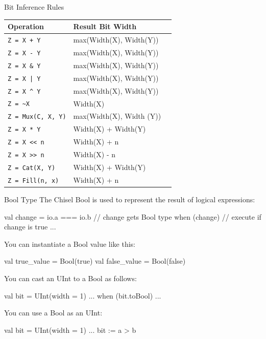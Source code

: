 \documentclass[xcolor=pdflatex,dvipsnames,table]{beamer}
\begin{document}
\begin{frame}[fragile]{Bit Inference Rules}

\begin{center}
\begin{tabular}{| l | l | l | }
\hline
Operation & Result Bit Width \\ \hline
\verb!Z = X + Y! & max(Width(X), Width(Y))  \\ \hline
\verb+Z = X - Y+ & max(Width(X), Width(Y)) \\ \hline
\verb+Z = X & Y+ & max(Width(X), Width(Y)) \\ \hline
\verb+Z = X | Y+ & max(Width(X), Width(Y)) \\ \hline
\verb+Z = X ^ Y+ & max(Width(X), Width(Y)) \\ \hline
\verb+Z = ~X+ & Width(X) \\ \hline
\verb+Z = Mux(C, X, Y)+ & max(Width(X), Width (Y)) \\ \hline
\verb+Z = X * Y+ & Width(X) + Width(Y) \\ \hline
\verb+Z = X << n+ & Width(X) + n \\ \hline
\verb+Z = X >> n+ & Width(X) - n \\ \hline
\verb+Z = Cat(X, Y)+ & Width(X) + Width(Y) \\ \hline
\verb+Z = Fill(n, x)+ & Width(X) + n \\ \hline
\end{tabular}
\end{center}

\end{frame}

\begin{frame}[fragile]{Bool Type}
The Chisel Bool is used to represent the result of logical expressions:
\begin{scala}
val change = io.a === io.b // change gets Bool type
when (change) { // execute if change is true
 ...
} 
\end{scala}

You can instantiate a Bool value like this:
\begin{scala}
val true_value  = Bool(true)
val false_value = Bool(false)
\end{scala}

You can cast an UInt to a Bool as follows:
\begin{scala}
val bit = UInt(width = 1) ...
when (bit.toBool) { ... }
\end{scala}

You can use a Bool as an UInt:
\begin{scala}
val bit = UInt(width = 1) ...
bit := a > b
\end{scala}

\end{frame}
\end{document}
